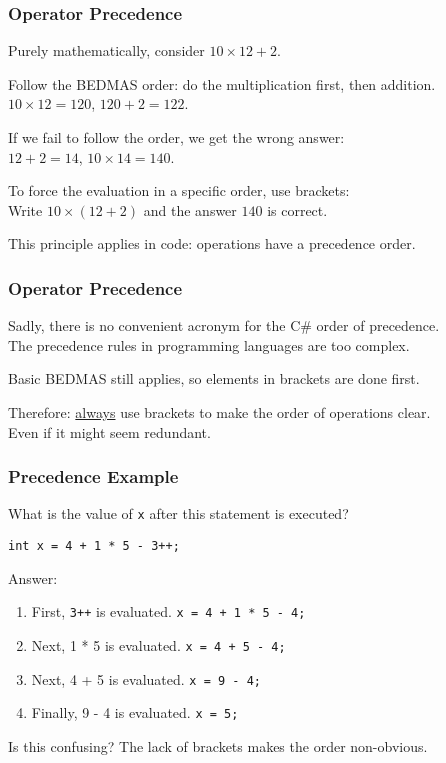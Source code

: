 \begin{frame}
\frametitle{Operator Precedence}

Purely mathematically, consider $10 \times 12 + 2$.

Follow the BEDMAS order: do the multiplication first, then addition.\\
$10 \times 12 = 120$, $120 + 2 = 122$.

If we fail to follow the order, we get the wrong answer:\\
$12 + 2 = 14$, $10 \times 14 = 140$.

To force the evaluation in a specific order, use brackets:\\
Write $10 \times (12 + 2)$ and the answer $140$ is correct.

This principle applies in code: operations have a precedence order.

\end{frame}

\begin{frame}
\frametitle{Operator Precedence}
Sadly, there is no convenient acronym for the C\# order of precedence.\\
\quad The precedence rules in programming languages are too complex.

Basic BEDMAS still applies, so elements in brackets are done first.

Therefore: \underline{always} use brackets to make the order of operations clear.\\
\quad Even if it might seem redundant.

\end{frame}

\begin{frame}
\frametitle{Precedence Example}

What is the value of \texttt{x} after this statement is executed?

\texttt{int x = 4 + 1 * 5 - 3++;}

Answer:
\begin{enumerate}
	\item First, \texttt{3++} is evaluated. \texttt{x = 4 + 1 * 5 - 4;}
	\item Next, 1 * 5 is evaluated. \texttt{x = 4 + 5 - 4;}
	\item Next, 4 + 5 is evaluated. \texttt{x = 9 - 4;}
	\item Finally, 9 - 4 is evaluated. \texttt{x = 5;}
\end{enumerate}

Is this confusing? The lack of brackets makes the order non-obvious.

\end{frame}

